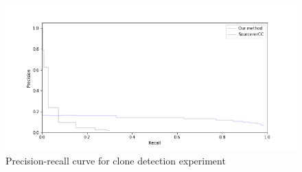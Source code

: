 \begin{figure}
  \centering\includegraphics[width=14cm]{images/pr-curve.png}
  \caption{\label{fig:clone-detection-experiment}Precision-recall curve
    for clone detection experiment}
\end{figure}

